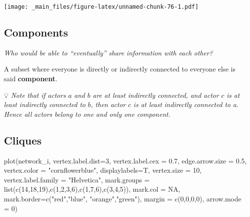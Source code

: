 \documentclass[
  notitlepage,
  onecolumn,
  openany]{book}
\newenvironment{Shaded}{\begin{snugshade}}{\end{snugshade}}
\newcommand{\AttributeTok}[1]{\textcolor[rgb]{0.77,0.63,0.00}{#1}}
\newcommand{\ConstantTok}[1]{\textcolor[rgb]{0.00,0.00,0.00}{#1}}
\newcommand{\DecValTok}[1]{\textcolor[rgb]{0.00,0.00,0.81}{#1}}
\newcommand{\FloatTok}[1]{\textcolor[rgb]{0.00,0.00,0.81}{#1}}
\newcommand{\FunctionTok}[1]{\textcolor[rgb]{0.00,0.00,0.00}{#1}}
\newcommand{\NormalTok}[1]{#1}
\newcommand{\StringTok}[1]{\textcolor[rgb]{0.31,0.60,0.02}{#1}}
\begin{document}
\texttt{[image: \_main\_files/figure-latex/unnamed-chunk-76-1.pdf]}

\hypertarget{components-1}{%
\subsection{Components}\label{components-1}}

\emph{Who would be able to ``eventually'' share information with each other?}

A subset where everyone is directly or indirectly connected to everyone else is said \textbf{component}.

💡 \emph{Note that if actors \(a\) and \(b\) are at least indirectly connected, and actor \(c\) is at least indirectly connected to \(b\), then actor \(c\) is at least indirectly connected to a. Hence all actors belong to one and only one component.}

\hypertarget{cliques}{%
\subsection{Cliques}\label{cliques}}

\begin{Shaded}
\begin{Highlighting}[]
\FunctionTok{plot}\NormalTok{(network\_i,}
     \AttributeTok{vertex.label.dist=}\DecValTok{3}\NormalTok{,}
     \AttributeTok{vertex.label.cex =} \FloatTok{0.7}\NormalTok{,}
     \AttributeTok{edge.arrow.size =} \FloatTok{0.5}\NormalTok{,}
     \AttributeTok{vertex.color =} \StringTok{"cornflowerblue"}\NormalTok{,}
     \AttributeTok{displaylabels=}\NormalTok{T,}
     \AttributeTok{vertex.size =} \DecValTok{10}\NormalTok{,}
     \AttributeTok{vertex.label.family =} \StringTok{"Helvetica"}\NormalTok{,}
     \AttributeTok{mark.groups =} \FunctionTok{list}\NormalTok{(}\FunctionTok{c}\NormalTok{(}\DecValTok{14}\NormalTok{,}\DecValTok{18}\NormalTok{,}\DecValTok{19}\NormalTok{),}\FunctionTok{c}\NormalTok{(}\DecValTok{1}\NormalTok{,}\DecValTok{2}\NormalTok{,}\DecValTok{3}\NormalTok{,}\DecValTok{6}\NormalTok{),}\FunctionTok{c}\NormalTok{(}\DecValTok{1}\NormalTok{,}\DecValTok{7}\NormalTok{,}\DecValTok{6}\NormalTok{),}\FunctionTok{c}\NormalTok{(}\DecValTok{3}\NormalTok{,}\DecValTok{4}\NormalTok{,}\DecValTok{5}\NormalTok{)),}
     \AttributeTok{mark.col =} \ConstantTok{NA}\NormalTok{,}
     \AttributeTok{mark.border=}\FunctionTok{c}\NormalTok{(}\StringTok{"red"}\NormalTok{,}\StringTok{"blue"}\NormalTok{, }\StringTok{"orange"}\NormalTok{,}\StringTok{"green"}\NormalTok{),}
     \AttributeTok{margin =} \FunctionTok{c}\NormalTok{(}\DecValTok{0}\NormalTok{,}\DecValTok{0}\NormalTok{,}\DecValTok{0}\NormalTok{,}\DecValTok{0}\NormalTok{),}
     \AttributeTok{arrow.mode =} \DecValTok{0}\NormalTok{)}
\end{Highlighting}
\end{Shaded}
\end{document}
